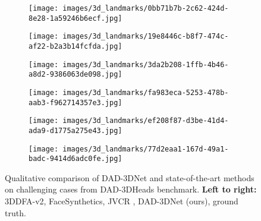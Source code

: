 \documentclass[10pt,twocolumn,letterpaper]{article}
\begin{document}
\begin{figure*}[t]\centering
    \begin{subfigure}[t]{0.85\textwidth}
        \texttt{[image: images/3d\_landmarks/0bb71b7b-2c62-424d-8e28-1a59246b6ecf.jpg]}
    \end{subfigure}
    \begin{subfigure}[t]{0.85\textwidth}
        \texttt{[image: images/3d\_landmarks/19e8446c-b8f7-474c-af22-b2a3b14fcfda.jpg]}
    \end{subfigure}
    \begin{subfigure}[t]{0.85\textwidth}
        \texttt{[image: images/3d\_landmarks/3da2b208-1ffb-4b46-a8d2-9386063de098.jpg]}
    \end{subfigure}
    \begin{subfigure}[t]{0.85\textwidth}
        \texttt{[image: images/3d\_landmarks/fa983eca-5253-478b-aab3-f962714357e3.jpg]}
    \end{subfigure}
        \begin{subfigure}[t]{0.85\textwidth}
        \texttt{[image: images/3d\_landmarks/ef208f87-d3be-41d4-ada9-d1775a275e43.jpg]}
    \end{subfigure}
        \begin{subfigure}[t]{0.85\textwidth}
        \texttt{[image: images/3d\_landmarks/77d2eaa1-167d-49a1-badc-9414d6adc0fe.jpg]}
    \end{subfigure}
\caption{Qualitative comparison of DAD-3DNet  and state-of-the-art methods on challenging cases from DAD-3DHeads benchmark. \textbf{Left to right:} 3DDFA-v2\cite{guo2020towards}, FaceSynthetics\cite{wood2021fake}, JVCR \cite{jvcr}, DAD-3DNet (ours), ground truth.}
\vspace{-1em}
\label{fig:3d_landmarks_dad_a}
\end{figure*}\begin{figure*}[t]\ContinuedFloat
            \centering


\end{figure*}
\end{document}
